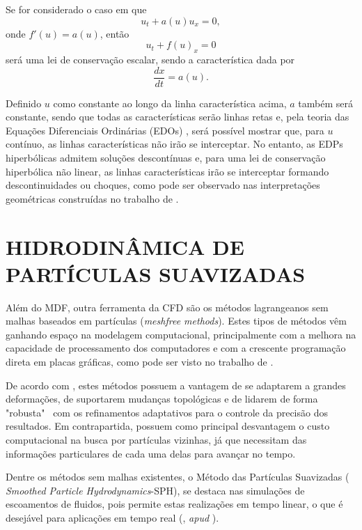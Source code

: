 Se for considerado o caso em que
\begin{equation}
u_t + a(u)u_x = 0,
\end{equation}
onde $ f'(u) = a(u)$, então
\begin{equation}
u_t + f(u)_x = 0
\end{equation}
será uma lei de conservação escalar, sendo a característica dada por
\begin{equation}
\frac{dx}{dt} = a(u).
\end{equation}

Definido $u$ como constante ao longo da linha característica acima, $a$ também será constante, sendo que todas as características serão linhas retas e, pela teoria das Equações Diferenciais Ordinárias (EDOs) \cite{kreyszig}, será possível mostrar que, para $u$ contínuo, as linhas características não irão se interceptar. No entanto, as EDPs hiperbólicas admitem soluções descontínuas e, para uma lei de conservação hiperbólica não linear, as linhas características irão se interceptar formando descontinuidades ou choques, como pode ser observado nas interpretações geométricas construídas no trabalho de .

\section{HIDRODINÂMICA DE PARTÍCULAS SUAVIZADAS} \label{Hidro_SPH}

Além do MDF, outra ferramenta da CFD são os métodos lagrangeanos sem malhas baseados em partículas (\textit{meshfree methods}). Estes tipos de métodos vêm ganhando espaço na modelagem computacional, principalmente com a melhora na capacidade de processamento dos computadores e com a crescente programação direta em placas gráficas, como pode ser visto no trabalho de .

De acordo com , estes métodos possuem a vantagem de se adaptarem a grandes deformações, de suportarem mudanças topológicas e de lidarem de forma "robusta" \ com os refinamentos adaptativos para o controle da precisão dos resultados. Em contrapartida, possuem como principal desvantagem o custo computacional na busca por partículas vizinhas, já que necessitam das informações particulares de cada uma delas para avançar no tempo.

Dentre os métodos sem malhas existentes, o Método das Partículas Suavizadas ( \textit{Smoothed Particle Hydrodynamics}-SPH), se destaca nas simulações de escoamentos de fluidos, pois permite estas realizações em tempo linear, o que é desejável para aplicações em tempo real (, \textit{apud} ).

